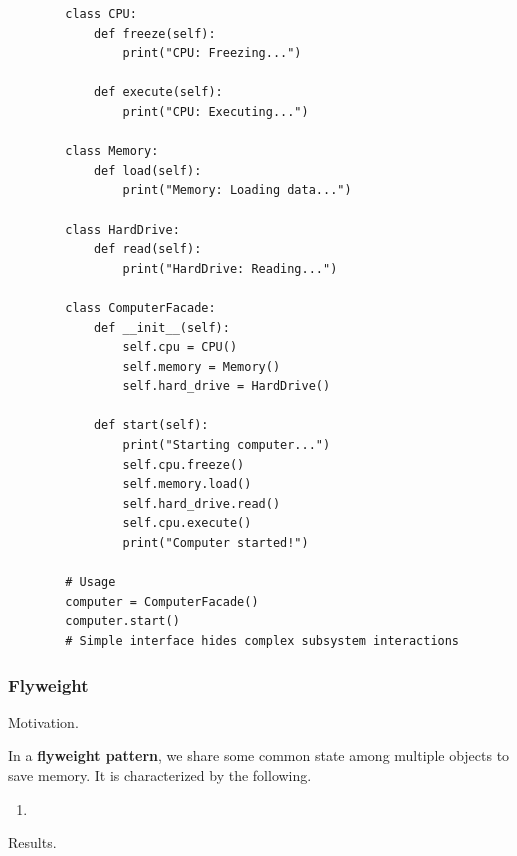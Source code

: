     \begin{example}
      \label{ex:case-study-5}
      \begin{lstlisting}
        class CPU:
            def freeze(self):
                print("CPU: Freezing...")
            
            def execute(self):
                print("CPU: Executing...")

        class Memory:
            def load(self):
                print("Memory: Loading data...")

        class HardDrive:
            def read(self):
                print("HardDrive: Reading...")

        class ComputerFacade:
            def __init__(self):
                self.cpu = CPU()
                self.memory = Memory()
                self.hard_drive = HardDrive()
            
            def start(self):
                print("Starting computer...")
                self.cpu.freeze()
                self.memory.load()
                self.hard_drive.read()
                self.cpu.execute()
                print("Computer started!")

        # Usage
        computer = ComputerFacade()
        computer.start()
        # Simple interface hides complex subsystem interactions 
      \end{lstlisting}
    \end{example}

  \subsubsection{Flyweight}

    Motivation. 

    \begin{definition}
      \label{def:flyweight-pattern}
      In a \textbf{flyweight pattern}, we share some common state among multiple objects to save memory. It is characterized by the following. 
      \begin{enumerate}
        \item 
      \end{enumerate}
    \end{definition}

    Results. 


